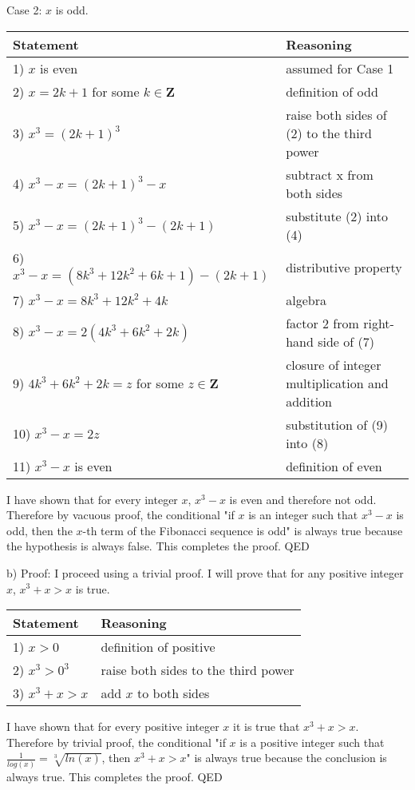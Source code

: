 \begin{enumerate}
\begin{solution}
    Case 2: $x$ is odd.
    
    \begin{tabular}{l|l}
    Statement & Reasoning \\ \hline
    1) $x$ is even & assumed for Case 1\\
    2) $x = 2k + 1$ for some $k \in \mathbf{Z}$ & definition of odd\\
    3) $x^3 = (2k + 1)^3$ & raise both sides of (2) to the third power\\
    4) $x^3 - x = (2k + 1)^3 - x$ & subtract x from both sides\\
    5) $x^3 - x = (2k + 1)^3 - (2k + 1)$ & substitute (2) into (4)\\
    6) $x^3 - x = (8k^3 + 12k^2 + 6k + 1) - (2k + 1)$ & distributive property\\
    7) $x^3 - x = 8k^3 + 12k^2 + 4k$ & algebra\\
    8) $x^3 - x = 2(4k^3 + 6k^2 + 2k)$ & factor 2 from right-hand side of (7)\\
    9) $4k^3 + 6k^2 + 2k = z$ for some $z \in \mathbf{Z}$ & closure of integer multiplication and addition\\
    10) $x^3 - x = 2z$ & substitution of (9) into (8)\\
    11) $x^3 - x$ is even & definition of even
    \end{tabular}
    
    I have shown that for every integer $x$, $x^3 - x$ is even and therefore not odd. Therefore by vacuous proof, the conditional "if $x$ is an integer such that $x^3 - x$ is odd, then the $x$-th term of the Fibonacci sequence is odd" is always true because the hypothesis is always false. This completes the proof. QED
    
    b) Proof: I proceed using a trivial proof. I will prove that for any positive integer $x$, $x^3 + x > x$ is true.
    
    \begin{tabular}{l|l}
    Statement & Reasoning \\ \hline
    1) $x > 0$ & definition of positive\\
    2) $x^3 > 0^3$ & raise both sides to the third power\\
    3) $x^3 + x > x$ & add $x$ to both sides\\
    \end{tabular}
    
    I have shown that for every positive integer $x$ it is true that $x^3 + x > x$. Therefore by trivial proof, the conditional "if $x$ is a positive integer such that $\frac{1}{log(x)} = \sqrt[3]{ln(x)}$, then $x^3 + x > x$" is always true because the conclusion is always true. This completes the proof. QED
    
    \end{solution}
    
\end{enumerate}